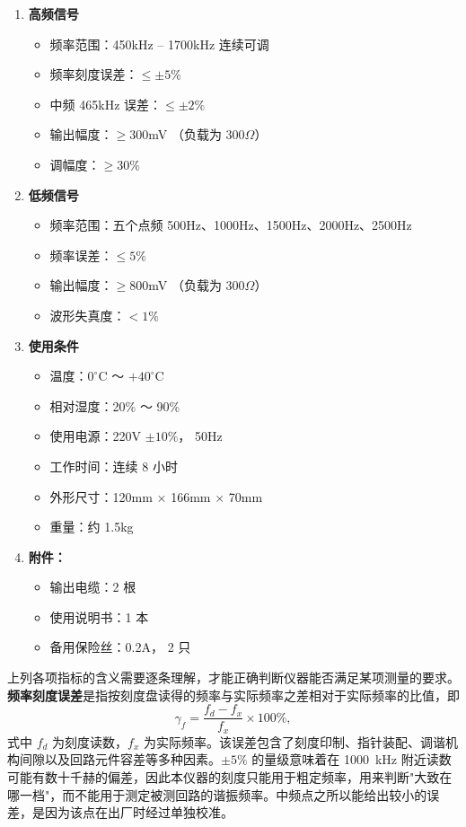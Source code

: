 \documentclass[12pt,UTF8]{ctexbook}
\begin{document}
\begin{enumerate}
	\item \textbf{高频信号}
	\begin{itemize}
		\item 频率范围：450kHz -- 1700kHz 连续可调
		\item 频率刻度误差：\(\le \pm 5\%\)
		\item 中频 465kHz 误差：\(\le \pm 2\%\)
		\item 输出幅度：\(\ge 300\)mV （负载为 300\(\Omega\)）
		\item 调幅度：\(\ge 30\%\)
	\end{itemize}
	\item \textbf{低频信号}
	\begin{itemize}
		\item 频率范围：五个点频 500Hz、1000Hz、1500Hz、2000Hz、2500Hz
		\item 频率误差：\(\le 5\%\)
		\item 输出幅度：\(\ge 800\)mV （负载为 300\(\Omega\)）
		\item 波形失真度：\(< 1\%\)
	\end{itemize}
	\item \textbf{使用条件}
	\begin{itemize}
		\item 温度：\(0^\circ\)C ～ \(+40^\circ\)C
		\item 相对湿度：20\% ～ 90\%
		\item 使用电源：220V \(\pm 10\%\)， 50Hz
		\item 工作时间：连续 8 小时
		\item 外形尺寸：120mm \(\times\) 166mm \(\times\) 70mm
		\item 重量：约 1.5kg
	\end{itemize}
	\item \textbf{附件：}
	\begin{itemize}
		\item 输出电缆：2 根
		\item 使用说明书：1 本
		\item 备用保险丝：0.2A， 2 只
	\end{itemize}
\end{enumerate}

上列各项指标的含义需要逐条理解，才能正确判断仪器能否满足某项测量的要求。\textbf{频率刻度误差}是指按刻度盘读得的频率与实际频率之差相对于实际频率的比值，即
\[
\gamma_f = \frac{f_d - f_x}{f_x} \times 100\%,
\]
式中 $f_d$ 为刻度读数，$f_x$ 为实际频率。该误差包含了刻度印制、指针装配、调谐机构间隙以及回路元件容差等多种因素。$\pm 5\%$ 的量级意味着在 1000~kHz 附近读数可能有数十千赫的偏差，因此本仪器的刻度只能用于粗定频率，用来判断"大致在哪一档"，而不能用于测定被测回路的谐振频率。中频点之所以能给出较小的误差，是因为该点在出厂时经过单独校准。
\end{document}
